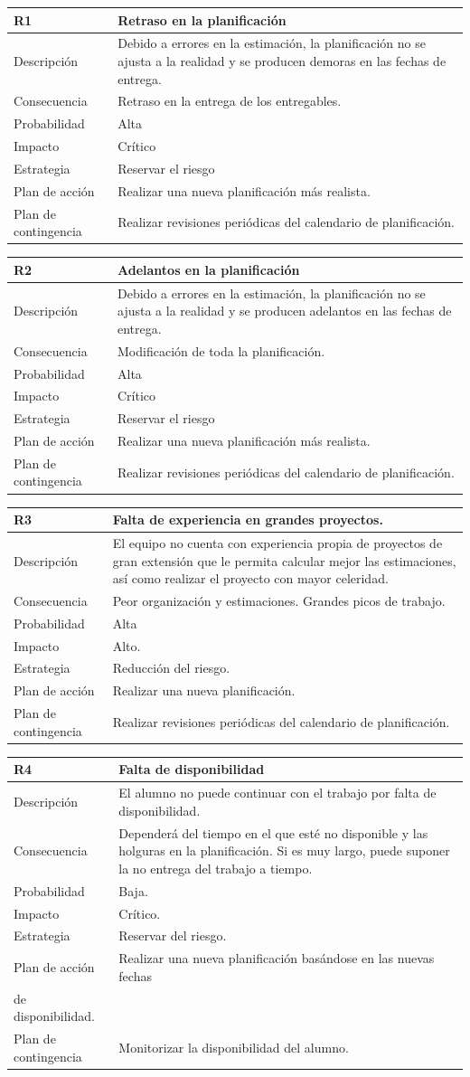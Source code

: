 \documentclass[twoside]{report}
\newcommand\addrow[2]{#1 &#2\\ }
\newcommand\addheading[2]{#1 &#2\\ \hline}
\newcommand\tabularhead{\begin{tabular}{lp{0.7\textwidth}}
\hline
}
\newenvironment{risk}{\tabularhead}
{\hline\end{tabular}}
\begin{document}
\vspace{0.5cm}

\begin{risk}
  \addheading{R1}{Retraso en la planificación}
  \addrow{Descripción}{Debido a errores en la estimación, la planificación no se ajusta a la realidad y se producen demoras en las fechas de entrega.}
  \addrow{Consecuencia}{Retraso en la entrega de los entregables.}
  \addrow{Probabilidad}{Alta }
  \addrow{Impacto}{Crítico}
  \addrow{Estrategia}{Reservar el riesgo}
  \addrow{Plan de acción}{Realizar una nueva planificación más realista. }
  \addrow{Plan de contingencia}{Realizar revisiones periódicas del calendario de planificación.}
\end{risk}

\vspace{0.5cm}

\begin{risk}
  \addheading{R2}{Adelantos en la planificación}
  \addrow{Descripción}{Debido a errores en la estimación, la planificación no se ajusta a la realidad y se producen adelantos en las fechas de entrega.}
  \addrow{Consecuencia}{Modificación de toda la planificación.}
  \addrow{Probabilidad}{Alta }
  \addrow{Impacto}{Crítico}
  \addrow{Estrategia}{Reservar el riesgo}
  \addrow{Plan de acción}{Realizar una nueva planificación más realista. }
  \addrow{Plan de contingencia}{Realizar revisiones periódicas del calendario de planificación.}
\end{risk}

\vspace{0.5cm}

\begin{risk}
  \addheading{R3}{Falta de experiencia en grandes proyectos.}
  \addrow{Descripción}{El equipo no cuenta con experiencia propia de proyectos de gran extensión que le permita calcular mejor las estimaciones, así como realizar el proyecto con mayor celeridad.}
  \addrow{Consecuencia}{Peor organización y estimaciones. Grandes picos de trabajo.}
  \addrow{Probabilidad}{Alta }
  \addrow{Impacto}{Alto. }
  \addrow{Estrategia}{Reducción del riesgo.}
  \addrow{Plan de acción}{Realizar una nueva planificación. }
  \addrow{Plan de contingencia}{Realizar revisiones periódicas del calendario de planificación.}
\end{risk}

\vspace{0.5cm}

\begin{risk}
  \addheading{R4}{Falta de disponibilidad}
  \addrow{Descripción}{El alumno no puede continuar con el trabajo por falta de disponibilidad.}
  \addrow{Consecuencia}{Dependerá del tiempo en el que esté no disponible y las holguras en la planificación. Si es muy largo, puede suponer la no entrega del trabajo a tiempo.}
  \addrow{Probabilidad}{Baja.}
  \addrow{Impacto}{Crítico. }
  \addrow{Estrategia}{Reservar del riesgo.}
  \addrow{Plan de acción}{Realizar una nueva planificación basándose en las nuevas fechas \\de disponibilidad.}
  \addrow{Plan de contingencia}{Monitorizar la disponibilidad del alumno.}
\end{risk}
\end{document}
